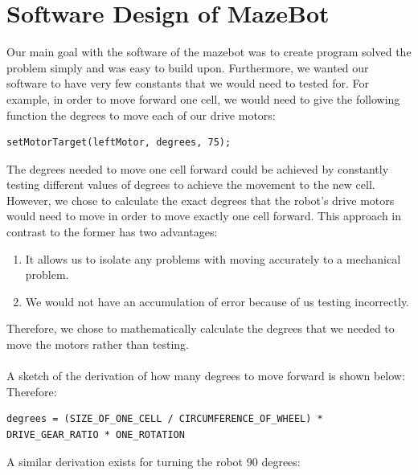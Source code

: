\documentclass[11pt]{article}
\begin{document}
\section{Software Design of MazeBot}
Our main goal with the software of the mazebot was to create program solved the problem simply and was easy to build upon. Furthermore, we wanted our software to have very few constants that we would need to tested for. For example, in order to move forward one cell, we would need to give the following function the degrees to move each of our drive motors:
\begin{verbatim}
setMotorTarget(leftMotor, degrees, 75);
\end{verbatim}
The degrees needed to move one cell forward could be achieved by constantly testing different values of degrees to achieve the movement to the new cell. However, we chose to calculate the exact degrees that the robot's drive motors would need to move in order to move exactly one cell forward. This approach in contrast to the former has two advantages: 
\begin{enumerate}
\item It allows us to isolate any problems with moving accurately to a mechanical problem.
\item We would not have an accumulation of error because of us testing incorrectly.
\end{enumerate}
Therefore, we chose to mathematically calculate the degrees that we needed to move the motors rather than testing.\\\\
A sketch of the derivation of how many degrees to move forward is shown below: %
\\
Therefore:
\begin{verbatim}
degrees = (SIZE_OF_ONE_CELL / CIRCUMFERENCE_OF_WHEEL) * DRIVE_GEAR_RATIO * ONE_ROTATION
\end{verbatim}
A similar derivation exists for turning the robot 90 degrees: %

\newpage

\end{document}
